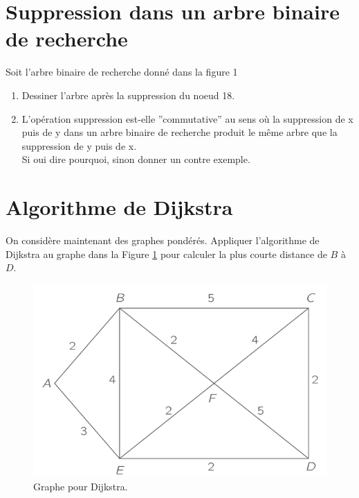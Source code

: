 \documentclass{article}[12pt]
\begin{document}
\section*{Suppression dans un arbre binaire de recherche}
Soit l’arbre binaire de recherche donné dans la figure 1
\begin{enumerate}
    \item Dessiner l’arbre après la suppression du noeud 18.
    \item  L’opération suppression est-elle ”commutative” au sens où la suppression de x puis de y dans un arbre binaire de recherche produit le même arbre que la suppression de y puis
de x.\\
Si oui dire pourquoi, sinon donner un contre exemple.
\end{enumerate}



\newpage

\section*{Algorithme de Dijkstra}
On considère maintenant des graphes pondérés. Appliquer l'algorithme de Dijkstra au graphe dans la Figure \ref{fig:grapheDijkstra} pour calculer la plus courte distance de $B$ à $D$.

\begin{figure}[h!] 
  \centering
\includegraphics[scale =0.3]{Djikstra.png}
\caption{Graphe pour Dijkstra.} \label{fig:grapheDijkstra}
\end{figure}
\end{document}
